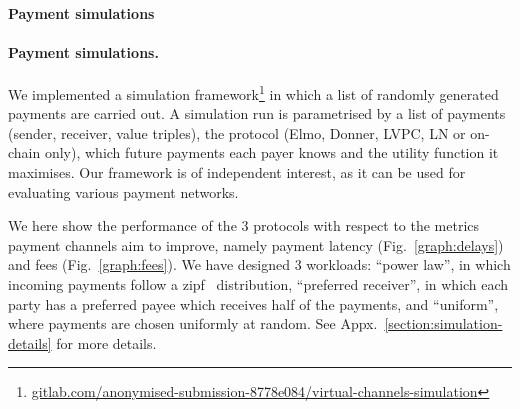   \makeatletter%
    {\paragraph{Payment simulations}}%
    {\paragraph{Payment simulations.}}%
  \makeatother%
  We implemented a simulation
  framework\footnote{\url{gitlab.com/anonymised-submission-8778e084/virtual-channels-simulation}}
  in which a list of randomly generated payments are carried out.
  A simulation run is parametrised by a list of payments
  (sender, receiver, value triples), the protocol (Elmo, Donner, LVPC, LN or
  on-chain only), which future payments each payer knows and the utility
  function it maximises.
%
%
  Our framework is of independent interest, as it can be used for evaluating
  various payment networks.

  We here
  show the performance of the $3$ protocols with respect to the metrics payment
  channels aim to improve, namely payment latency (Fig.~\ref{graph:delays}) and
  fees (Fig.~\ref{graph:fees}). We have designed 3 workloads: ``power law'', in
  which incoming payments follow a zipf~\cite{powers-1998-applications}
  distribution, ``preferred receiver'', in which each party has a preferred
  payee which receives half of the payments, and ``uniform'', where payments are
  chosen uniformly at random.
  See Appx.~\ref{section:simulation-details} for more details.

